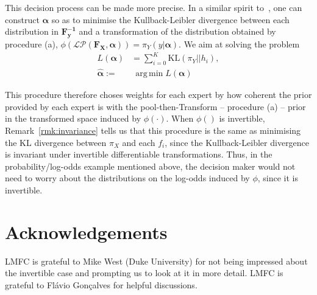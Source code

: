 \documentclass[a4paper, notitlepage, 10pt]{article}
\DeclareMathOperator*{\argmin}{arg\,min}
\begin{document}
This decision process can be made more precise.
In a similar spirit to~\cite{Carvalho2019}, one can construct $\boldsymbol\alpha$ so as to minimise the Kullback-Leibler divergence between each distribution in $\mathbf{F^{-1}_y}$ and a transformation of the distribution obtained by procedure (a), $ \phi(\mathcal{LP}(\mathbf{F_X}, \boldsymbol\alpha)) = \pi_{Y}(y | \boldsymbol\alpha)$.
We aim at solving the problem
\begin{align}
L(\boldsymbol\alpha) &= \sum_{i=0}^K \text{KL}(  \pi_{Y} || h_i), \\
     \hat{\boldsymbol\alpha}:=& \:\argmin L(\boldsymbol\alpha)  \nonumber
\end{align}

This procedure therefore choses weights for each expert by how coherent the prior provided by each expert is with the pool-then-Transform -- procedure (a) -- prior in the transformed space induced by $\phi(\cdot)$.
When $\phi()$ is invertible, Remark~\ref{rmk:invariance} tells us that this procedure is the same as minimising the KL divergence between $\pi_X$ and each $f_i$, since the Kullback-Leibler divergence is invariant under invertible differentiable transformations.
Thus, in the probability/log-odds example mentioned above, the decision maker would not need to worry about the distributions on the log-odds induced by $\phi$, since it is invertible.

\section*{Acknowledgements}

LMFC is grateful to Mike West (Duke University) for not being impressed about the invertible case and prompting us to look at it in more detail.
LMFC is grateful to Flávio Gonçalves for helpful discussions.


\end{document}
